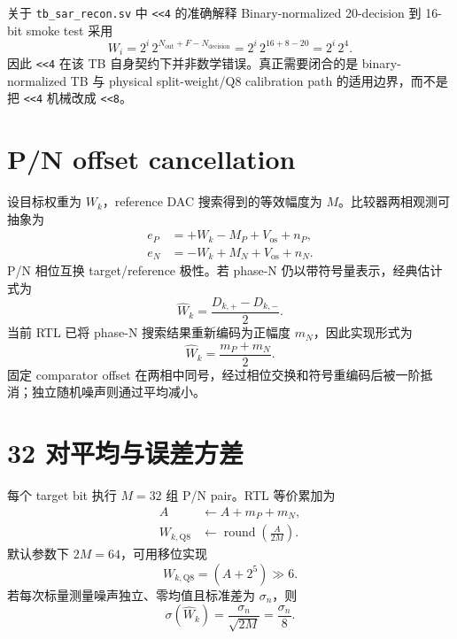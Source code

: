 \documentclass[UTF8,fontset=none,a4paper,11pt,openany]{ctexrep}
\begin{document}
\begin{methodbox}{关于 \texttt{tb\_sar\_recon.sv} 中 \texttt{<<4} 的准确解释}
Binary-normalized 20-decision 到 16-bit smoke test 采用
\begin{equation*}
W_i=2^i\,2^{N_{\mathrm{out}}+F-N_{\mathrm{decision}}}
=2^i\,2^{16+8-20}=2^i\,2^4.
\end{equation*}
因此 \texttt{<<4} 在该 TB 自身契约下并非数学错误。真正需要闭合的是 binary-normalized TB 与 physical split-weight/Q8 calibration path 的适用边界，而不是把 \texttt{<<4} 机械改成 \texttt{<<8}。
\end{methodbox}

\section{P/N offset cancellation}

设目标权重为 $W_k$，reference DAC 搜索得到的等效幅度为 $M$。比较器两相观测可抽象为
\begin{align}
e_P &= +W_k-M_P+V_{\mathrm{os}}+n_P,\\
e_N &= -W_k+M_N+V_{\mathrm{os}}+n_N.
\end{align}
P/N 相位互换 target/reference 极性。若 phase-N 仍以带符号量表示，经典估计式为
\begin{equation}
\widehat W_k=\frac{D_{k,+}-D_{k,-}}{2}.
\end{equation}
当前 RTL 已将 phase-N 搜索结果重新编码为正幅度 $m_N$，因此实现形式为
\begin{equation}
\widehat W_k=\frac{m_P+m_N}{2}.
\label{eq:pn-estimator}
\end{equation}
固定 comparator offset 在两相中同号，经过相位交换和符号重编码后被一阶抵消；独立随机噪声则通过平均减小。

\section{32 对平均与误差方差}

每个 target bit 执行 $M=32$ 组 P/N pair。RTL 等价累加为
\begin{align}
A &\leftarrow A+m_P+m_N,\\
W_{k,\mathrm{Q8}} &\leftarrow \operatorname{round}\!\left(\frac{A}{2M}\right).
\end{align}
默认参数下 $2M=64$，可用移位实现
\begin{equation}
W_{k,\mathrm{Q8}}=(A+2^5)\gg6.
\end{equation}
若每次标量测量噪声独立、零均值且标准差为 $\sigma_n$，则
\begin{equation}
\sigma(\widehat W_k)=\frac{\sigma_n}{\sqrt{2M}}=\frac{\sigma_n}{8}.
\label{eq:avg-noise}
\end{equation}
\end{document}

